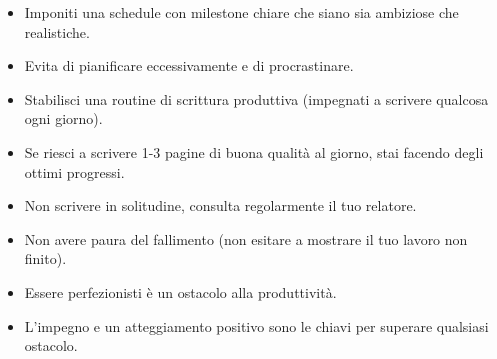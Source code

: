 \begin{itemize}

\item Imponiti una schedule con milestone chiare che siano sia ambiziose che realistiche.

\item Evita di pianificare eccessivamente e di procrastinare.

\item Stabilisci una routine di scrittura produttiva (impegnati a scrivere qualcosa ogni giorno).

\item Se riesci a scrivere 1-3 pagine di buona qualità al giorno, stai facendo degli ottimi progressi.

\item Non scrivere in solitudine, consulta regolarmente il tuo relatore.

\item Non avere paura del fallimento (non esitare a mostrare il tuo lavoro non finito).

\item Essere perfezionisti è un ostacolo alla produttività.

\item L'impegno e un atteggiamento positivo sono le chiavi per superare qualsiasi ostacolo.

\end{itemize}